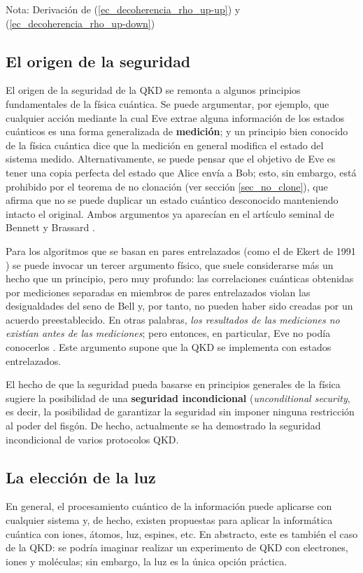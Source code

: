 \documentclass[a4paper,11pt]{book} %
\numberwithin{equation}{chapter}
\begin{document}
\begin{mybox_blue}{Nota: Derivación de (\ref{ec_decoherencia_rho_up-up}) y  (\ref{ec_decoherencia_rho_up-down})}
		\subsection{El origen de la seguridad}

El origen de la seguridad de la QKD se remonta a algunos principios fundamentales de la física cuántica. Se puede argumentar, por ejemplo, que cualquier acción mediante la cual Eve extrae alguna información de los estados cuánticos es una forma generalizada de \textbf{medición}; y un principio bien conocido de la física cuántica dice que la medición en general modifica el estado del sistema medido. Alternativamente, se puede pensar que el objetivo de Eve es tener una copia perfecta del estado que Alice envía a Bob; esto, sin embargo, está prohibido por el teorema de no clonación (ver sección \ref{sec_no_clone}), que afirma que no se puede duplicar un estado cuántico desconocido manteniendo intacto el original. Ambos argumentos ya aparecían en el artículo seminal de Bennett y Brassard \cite{BB84}. 

Para los algoritmos que se basan en pares entrelazados (como el de Ekert de 1991 \cite{Ekert-1991})  se puede invocar un tercer argumento físico, que suele considerarse más un hecho que un principio, pero muy profundo: las correlaciones cuánticas obtenidas por mediciones separadas en miembros de pares entrelazados violan las desigualdades del seno de Bell y, por tanto, no pueden haber sido creadas por un acuerdo preestablecido. En otras palabras, \textit{los resultados de las mediciones no existían antes de las mediciones}; pero entonces, en particular, Eve no podía conocerlos \cite{Ekert-1991}. Este argumento supone que la QKD se implementa con estados entrelazados.		

El hecho de que la seguridad pueda basarse en principios generales de la física sugiere la posibilidad de una \textbf{seguridad incondicional} (\textit{unconditional security}, es decir, la posibilidad de garantizar la seguridad sin imponer ninguna restricción al poder del fisgón. De hecho, actualmente se ha demostrado la seguridad incondicional de varios protocolos QKD.
		
		\subsection{La elección de la luz}

En general, el procesamiento cuántico de la información puede aplicarse con cualquier sistema y, de hecho, existen propuestas para aplicar la informática cuántica con iones, átomos, luz, espines, etc. En abstracto, este es también el caso de la QKD: se podría imaginar realizar un experimento de QKD con electrones, iones y moléculas; sin embargo, la luz es la única opción práctica.


\end{mybox_blue}
\end{document}
